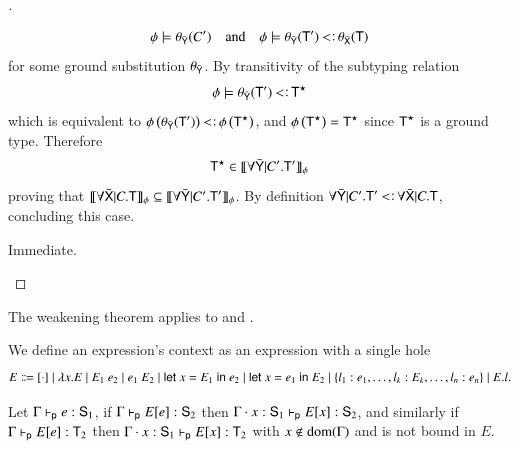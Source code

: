 \documentclass{report}
\begin{document}
\begin{proof}[]
\begin{indcase}{\sdfin}
      \begin{displaymath}
        \phi\csat\theta_{\bar{\type{Y}}}(C')\quad\textrm{and}\quad
        \phi\csat\theta_{\bar{\type{Y}}}(\type{T}')\subtype\theta_{\bar{\type{X}}}(\type{T})
      \end{displaymath}
      for some ground substitution $\theta_{\bar{\textsf{Y}}}$. By transitivity of the subtyping
      relation 
      \begin{displaymath}
        \phi\csat\theta_{\bar{\type{Y}}}(\type{T}')\subtype\type{T}^\star
      \end{displaymath}
      which is equivalent to $\phi\lrp{\theta_{\bar{\type{Y}}}(\type{T}')}\subtype\phi\lrp{\type{T}^\star}$,
      and $\phi\left({\textsf{T}^\star}\right)=\textsf{T}^\star$ since $\textsf{T}^\star$ is a ground type.
      Therefore
      \begin{displaymath}
        \textsf{T}^\star\in\llbracket{\forall\bar{\textsf{Y}}|C'.\textsf{T}'}\rrbracket_{\phi}
      \end{displaymath}
      proving that $\llbracket{\forall\bar{\textsf{X}}|C.\textsf{T}}\rrbracket_{\phi}\subseteq\llbracket{\forall\bar{\textsf{Y}}|C'.\textsf{T}'}\rrbracket_{\phi}$.
      By definition  $\forall\bar{\type{Y}}|C'.\type{T}'\subtype\forall\bar{\type{X}}|C.\type{T}$,
      concluding this case.
    \end{indcase}
    \begin{indcase}{\decsub}
      Immediate.
    \end{indcase}
  \end{proof}
  \begin{cor}
    The weakening theorem applies to \BQ and \BQa.
  \end{cor}
  \begin{dfn}
    We define an expression's context as an expression with a single hole
    \begin{displaymath}
      E \Coloneqq [\cdot]
        \mid \lambda x.E
        \mid {E_1} \ {e_2}
        \mid {e_1} \ {E_2}
        \mid \textsf{let } {x} = {E_1} \textsf{ in } {e_2}
        \mid \textsf{let } {x} = {e_1} \textsf{ in } {E_2}
        \mid \left\{l_1:e_1,\ldots,l_k:E_k,\ldots,l_n:e_n\right\}
        \mid {E}.{l}\textrm{.}
    \end{displaymath}
  \end{dfn}
  \begin{thm}
    Let $\Gamma\vdash_\textsf{p} e:\textsf{S}_1$, if $\Gamma\vdash_\textsf{p} E[e]:\textsf{S}_2$ then
    $\Gamma\cdot x:\textsf{S}_1\vdash_\textsf{p} E[x]:\textsf{S}_2$, and similarly if
    $\Gamma\vdash_\textsf{p} E[e]:\textsf{T}_2$ then
    $\Gamma\cdot x:\textsf{S}_1\vdash_\textsf{p} E[x]:\textsf{T}_2$ with
    $x\notin\mathop{\rm dom}\nolimits(\Gamma)$ and is not bound in $E$.
  \end{thm}
\end{document}
